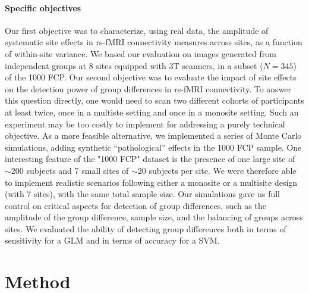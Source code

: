 \documentclass[authoryear]{elsarticle}
\begin{document}
\paragraph{Specific objectives}
Our first objective was to characterize, using real data, the amplitude of
systematic site effects in rs-fMRI connectivity measures across sites, as a function
of within-site variance. We based our evaluation on images generated from
independent groups at 8 sites equipped with 3T scanners, in a subset
($N=345$) of the 1000 FCP. Our second objective was to evaluate the impact of
site effects on the detection power of group differences in rs-fMRI
connectivity. To answer this question directly, one would need to scan two different cohorts of participants at least twice, once in a multiste setting and once in a monosite setting. Such an experiment may be too costly to implement for addressing a purely technical objective. As a more feasible alternative, we implemented a series of Monte Carlo simulations, adding synthetic ``pathological'' effects in the 1000 FCP sample.  One interesting feature of the "1000 FCP" dataset is the presence of one large site of $\sim200$ subjects and 7 small sites of $\sim20$ subjects per site. We were therefore able to implement realistic scenarios following either a monosite or a multisite design (with 7 sites), with the same total sample size. Our simulations gave us full control on critical aspects for detection of group differences, such as the amplitude of the group difference, sample
size, and the balancing of groups across sites. We evaluated the ability of detecting group differences both in terms of sensitivity for a GLM and in terms of accuracy for a SVM. 

\section{Method}
\end{document}
